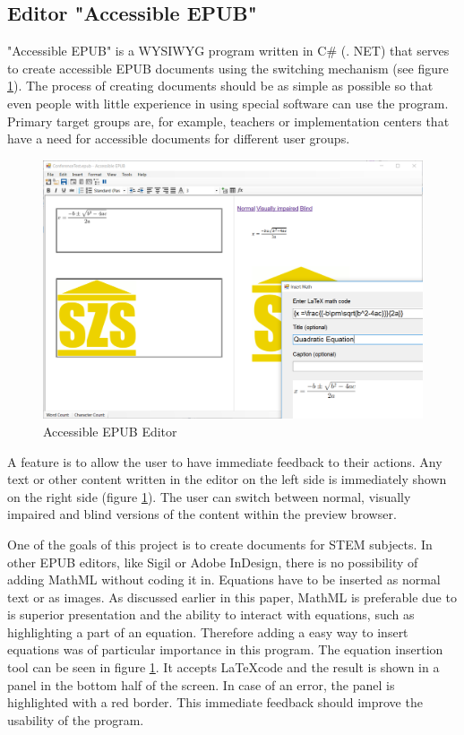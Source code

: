 \documentclass[runningheads,a4paper]{llncs}
\begin{document}

\subsection{Editor "Accessible EPUB"}
"Accessible EPUB" is a WYSIWYG program written in C\# (. NET) that serves to create accessible EPUB documents using the switching mechanism (see figure \ref{fig:editor}). The process of creating documents should be as simple as possible so that even people with little experience in using special software can use the program. Primary target groups are, for example, teachers or implementation centers that have a need for accessible documents for different user groups. 

\begin{figure}
	\centering
	\includegraphics[width=0.9\linewidth]{AccessibleEPUBequationNew.PNG}
	\caption{Accessible EPUB Editor}
	\label{fig:editor}
\end{figure}

A feature is to allow the user to have immediate feedback to their actions. Any text or other content written in the editor on the left side is immediately shown on the right side (figure \ref{fig:editor}). The user can switch between normal, visually impaired and blind versions of the content within the preview browser. 

One of the goals of this project is to create documents for STEM subjects. In other EPUB editors, like Sigil or Adobe InDesign, there is no possibility of adding MathML without coding it in. Equations have to be inserted as normal text or as images. As discussed earlier in this paper, MathML is preferable due to is superior presentation and the ability to interact with equations, such as highlighting a part of an equation. Therefore adding a easy way to insert equations was of particular importance in this program. The equation insertion tool can be seen in figure \ref{fig:editor}. It accepts \LaTeX   code and the result is shown in a panel in the bottom half of the screen. In case of an error, the panel is highlighted with a red border. This immediate feedback should improve the usability of the program.
\end{document}
